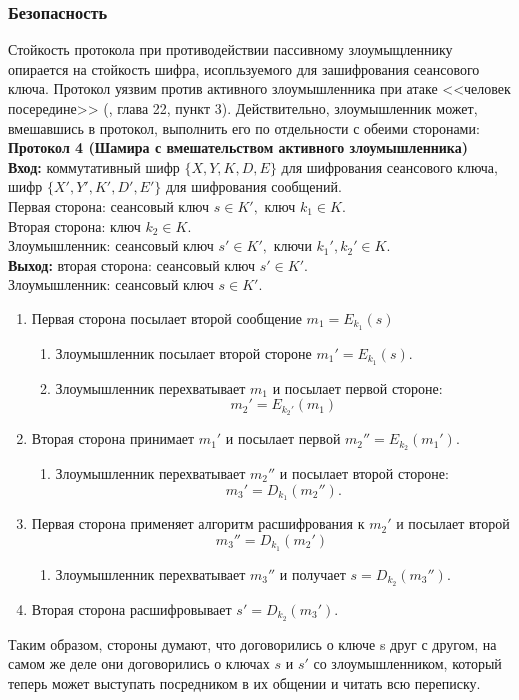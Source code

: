\subsubsection{Безопасность}
Стойкость протокола при противодействии пассивному злоумыщленнику опирается на стойкость шифра, исопльзуемого для зашифрования сеансового ключа. Протокол уязвим против активного злоумышленника при атаке <<человек посередине>> (\autocite{Shnayer}, глава 22, пункт 3). Действительно, злоумышленник может, вмешавшись в протокол, выполнить его по отдельности с обеими сторонами:\\
\textbf{Протокол 4 (Шамира с вмешательством активного злоумышленника)}\\
\hspace*{10mm}\textbf{Вход:} коммутативный шифр $\{X, Y, K, D, E\}$ для шифрования сеансового ключа, шифр $\{X', Y', K', D', E'\}$ для шифрования сообщений.\\
Первая сторона: сеансовый ключ $s\in K',$ ключ $k_{1}\in K.$\\
Вторая сторона: ключ $k_{2}\in K$.\\
Злоумышленник: сеансовый ключ $s'\in K',$  ключи $k_{1}',k_{2}'\in K.$\\
\hspace*{10mm}\textbf{Выход:} вторая сторона: сеансовый ключ $s'\in K'$.\\
Злоумышленник: сеансовый ключ $s\in K'.$
\begin{enumerate}
	\item Первая сторона посылает второй сообщение $m_{1} = E_{k_{1}}(s)$
	\begin{enumerate}
		\item Злоумышленник посылает второй стороне $m_{1}' = E_{k_{1}}(s).$
		\item Злоумышленник перехватывает $m_{1}$ и посылает первой стороне:
		$$m_{2}' = E_{k_{2}'}(m_{1})$$
	\end{enumerate}
	\item Вторая сторона принимает $m_1'$ и посылает первой $m_{2}''= E_{k_{2}} (m_{1}').$
	\begin{enumerate}
		\item Злоумышленник перехватывает $m_{2}''$ и посылает второй стороне:
		$$m_{3}'  = D_{k_{1}}(m_{2}'').$$
	\end{enumerate}
	\item Первая сторона применяет алгоритм расшифрования к $m_{2}'$ и посылает второй
	$$m_{3}'' = D_{k_{1}}(m_{2}')$$
	\begin{enumerate}
		\item Злоумышленник перехватывает $m_{3}''$ и получает $s = D_{k_{2}} (m_{3}'')$.
	\end{enumerate}
	\item Вторая сторона расшифровывает $s' = D_{k_{2}}(m_{3}')$.
\end{enumerate}
Таким образом, стороны думают, что договорились о ключе s друг с другом, на самом же деле они договорились о ключах $s$ и $s'$ со злоумышленником, который теперь может выступать посредником в их общении и читать всю переписку.
